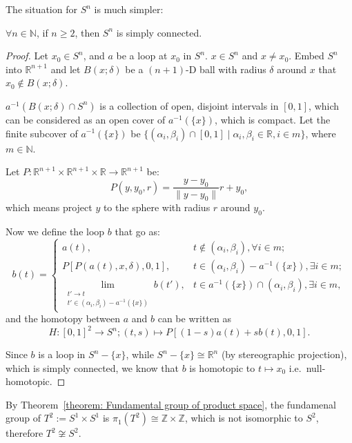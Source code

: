 \documentclass[openany, oneside, a5paper]{book}
\begin{document}
The situation for $S^n$ is much simpler:
\begin{theorem}\label{theorem: S^n for n >= 2 is simply connected}
    $\forall n \in \mathbb N$, if $n \geq 2$, then $S^n$ is simply connected.
\end{theorem}
\begin{proof}
    Let $x_0 \in S^n$, and $a$ be a loop at $x_0$ in $S^n$.
    $x \in S^n$ and $x \neq x_0$.
    Embed $S^n$ into $\mathbb R^{n+1}$ and let $B(x; \delta)$ be a $(n+1)$-D ball with radius $\delta$ around $x$ that $x_0 \notin B(x; \delta)$.

    $a^{-1}(B(x; \delta) \cap S^n)$ is a collection of open, disjoint intervals in $[0, 1]$, which can be considered as an open cover of $a^{-1}(\{x\})$, which is compact.
    Let the finite subcover of $a^{-1}(\{x\})$ be $\{(\alpha_i, \beta_i) \cap [0, 1] \mid \alpha_i, \beta_i \in \mathbb R, i \in m\}$, where $m \in \mathbb N$.

    
    Let $P \colon \mathbb R^{n+1} \times \mathbb R^{n+1} \times \mathbb R \to \mathbb R^{n+1}$ be:
    \begin{equation*}
        P(y, y_0, r) = \frac{y - y_0}{\|y - y_0\|} r + y_0,
    \end{equation*}
    which means project $y$ to the sphere with radius $r$ around $y_0$.

    Now we define the loop $b$ that go as:
    \begin{equation*}
        b(t) = \begin{cases}
            a(t),
                & t \notin (\alpha_i, \beta_i), \forall i \in m; \\
            P[P(a(t), x, \delta), 0, 1] , 
                & t \in (\alpha_i, \beta_i) - a^{-1}(\{x\}), \exists i \in m; \\
            \lim\limits_{\substack{t' \to t\\t' \in (\alpha_i, \beta_i) - a^{-1}(\{x\})}} b(t') , 
                & t \in a^{-1}(\{x\}) \cap (\alpha_i, \beta_i), \exists i \in m,
        \end{cases}
    \end{equation*}
    and the homotopy between $a$ and $b$ can be written as
    \begin{equation*}
        H \colon [0, 1]^2 \to S^n; (t, s) \mapsto P[(1 - s)a(t) + sb(t), 0, 1].
    \end{equation*}

    Since $b$ is a loop in $S^n - \{x\}$, while $S^n - \{x\} \cong \mathbb R^n$ (by stereographic projection), which is simply connected, we know that $b$ is homotopic to $t \mapsto x_0$ i.e.\ null-homotopic.
\end{proof}

By Theorem~\ref{theorem: Fundamental group of product space}, the fundamenal group of $T^2 := S^1 \times S^1$ is $\pi_1(T^2) \cong \mathbb Z \times \mathbb Z$, which is not isomorphic to $S^2$, therefore $T^2 \not\cong S^2$.

\backmatter{}
\nocite{*} %
\printbibliography[heading=bibliography, title={bibliography}]

\printindex[symbol]

\printindex
\end{document}
